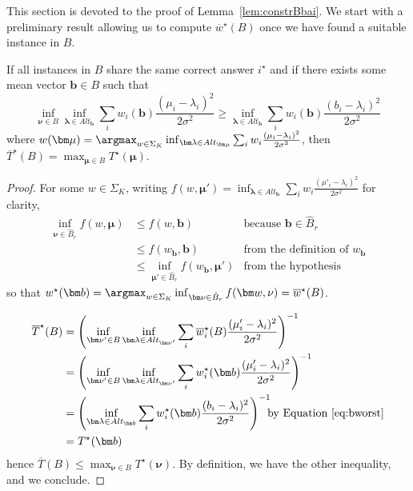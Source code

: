 This section is devoted to the proof of Lemma~\ref{lem:constrBbai}. We start with a preliminary result allowing us to compute $\overline{w}^\star(B)$ once we have found a suitable instance in $B$.


\begin{lemma}\label{lem:wbwst}
	If all instances in $B$ share the same correct answer $i^\star$ and if there exists some mean vector $\bm b\in B$ such that\begin{equation}\label{eq:bworst} \inf_{\bm\nu\in B}\inf_{\bm{\lambda}\in Alt_{\bm b}} \sum_i w_i(\bm{b}) \frac{(\mu_i-\lambda_i)^2}{2\sigma^2}\geq \inf_{\bm{\lambda}\in Alt_{\bm b}} \sum_i w_i(\bm{b}) \frac{(b_i-\lambda_i)^2}{2\sigma^2}\end{equation} where $w(\bm\mu)=\argmax_{w\in \Sigma_K} \inf_{\bm\lambda \in Alt_{\bm\mu}} \sum_i w_i \frac{(\mu_i-\lambda_i)^2}{2\sigma^2}$, then $\overline{T}^\star(B) = \max_{\bm \mu\in B}T^\star(\bm \mu)$.
\end{lemma}

\begin{proof}
	For some $w\in \Sigma_K$, writing $f(w,\bm\mu')=\inf_{\bm\lambda\in Alt_{\bm b}} \sum_i w_i \frac{(\mu'_i-\lambda_i)^2}{2\sigma^2}$ for clarity,
	\begin{align*}
		\inf_{\bm \nu\in \hat{B}_r} f( w,\bm\mu) &\leq f( w,\bm b) &\text{because }\bm b\in \hat{B}_r\\
		&\leq f(w_{\bm b},\bm b)& \text{from the definition of }w_{\bm b}\\
		&\leq \inf_{\bm\mu'\in\hat{B}_r} f(w_{\bm b},\bm\mu')&\text{from the hypothesis}
	\end{align*} so that $w^\star(\bm b) = \argmax_{w\in \Sigma_K} \inf_{\bm\nu\in\hat{B}_r} f(\bm w,\nu)=\overline w^\star(B)$.

\begin{align*}
	\overline{T}^\star(B) &= \left( \inf_{\bm\nu'\in B} \inf_{\bm\lambda \in Alt_{\bm\nu'}} \sum_i \overline{w}^\star_i(B) \frac{(\mu'_i-\lambda_i)^2}{2\sigma^2}\right)^{-1} &\\
	&=\left( \inf_{\bm\nu'\in B} \inf_{\bm\lambda \in Alt_{\bm\nu'}} \sum_i w^\star_i(\bm b) \frac{(\mu'_i-\lambda_i)^2}{2\sigma^2}\right)^{-1}&\\
	&=\left(  \inf_{\bm\lambda \in Alt_{\bm b}} \sum_i w^\star_i(\bm b) \frac{(b_i-\lambda_i)^2}{2\sigma^2}\right)^{-1}&\hspace{-5em}\text{by Equation~\eqref{eq:bworst}}\\
	&= T^\star(\bm b)&
\end{align*}
hence $\overline{T}(B) \leq \max_{\bm\nu\in B} T^\star(\bm\nu)$. By definition, we have the other inequality, and we conclude.
\end{proof}



